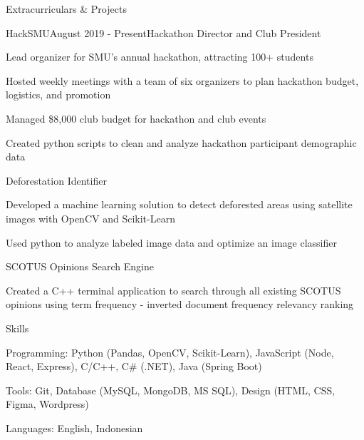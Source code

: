 \documentclass{resume} %
\begin{document}

\begin{rSection}{Extracurriculars \& Projects}
    \begin{rSubsection}{HackSMU}{August 2019 - Present}{Hackathon Director and Club President}{}
        \item Lead organizer for SMU's annual hackathon, attracting 100+ students 
        \item Hosted weekly meetings with a team of six organizers to plan hackathon budget, logistics, and promotion
        \item Managed \$8,000 club budget for hackathon and club events
        \item Created python scripts to clean and analyze hackathon participant demographic data
    \end{rSubsection}
    
    \begin{rSubsection}{Deforestation Identifier}{}{}{}
        \item Developed a machine learning solution to detect deforested areas using satellite images with OpenCV and Scikit-Learn
        \item Used python to analyze labeled image data and optimize an image classifier
    \end{rSubsection}

    \begin{rSubsection}{SCOTUS Opinions Search Engine}{}{}{}
        \item Created a C++ terminal application to search through all existing SCOTUS opinions using term frequency - inverted document frequency relevancy ranking
    \end{rSubsection}
\end{rSection}

\begin{rSection}{Skills}
    \begin{rSubsection}{}{}{}{}
        \item Programming: Python (Pandas, OpenCV, Scikit-Learn), JavaScript (Node, React, Express), C/C++, C\# (.NET), Java (Spring Boot)
        \item Tools: Git, Database (MySQL, MongoDB, MS SQL), Design (HTML, CSS, Figma, Wordpress)
        \item Languages: English, Indonesian
    \end{rSubsection}
\end{rSection}
\end{document}
